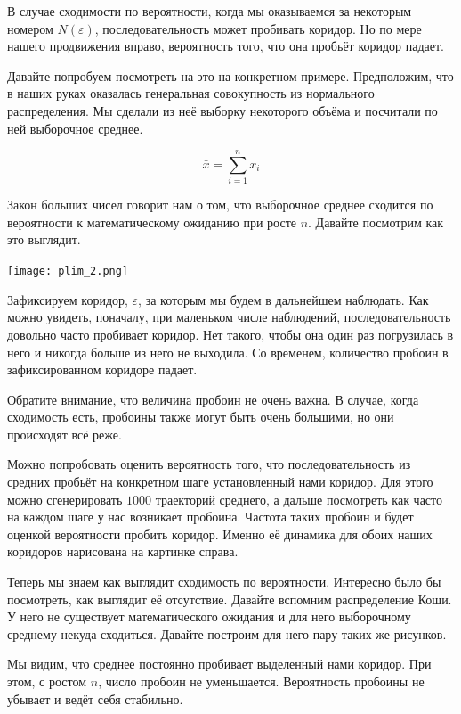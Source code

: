 \documentclass[12pt, a4paper, oneside]{article}
\begin{document}
В случае сходимости по вероятности, когда мы оказываемся за некоторым номером $N(\varepsilon)$, последовательность может пробивать коридор. Но по мере нашего продвижения вправо, вероятность того, что она пробьёт коридор падает. 

Давайте попробуем посмотреть на это на конкретном примере. Предположим, что в наших руках оказалась генеральная совокупность из нормального распределения. Мы сделали из неё выборку некоторого объёма и посчитали по ней выборочное среднее. 

$$
\bar x = \sum_{i=1}^n x_i
$$

Закон больших чисел говорит нам о том, что выборочное среднее сходится по вероятности к математическому ожиданию при росте $n$. Давайте посмотрим как это выглядит. 

\begin{center} 
\texttt{[image: plim\_2.png]}
\end{center} 

Зафиксируем коридор, $\varepsilon$, за которым мы будем в дальнейшем наблюдать. Как можно увидеть, поначалу, при маленьком числе наблюдений, последовательность довольно часто пробивает коридор. Нет такого, чтобы она один раз погрузилась в него и никогда больше из него не выходила. Со временем, количество пробоин в зафиксированном коридоре падает.

Обратите внимание, что величина пробоин не очень важна. В случае, когда сходимость есть, пробоины также могут быть очень большими, но они происходят всё реже. 

Можно попробовать оценить вероятность того, что последовательность из средних пробьёт на конкретном шаге установленный нами коридор. Для этого можно сгенерировать $1000$ траекторий среднего, а дальше посмотреть как часто на каждом шаге у нас возникает пробоина. Частота таких пробоин и будет оценкой вероятности пробить коридор. Именно её динамика для обоих наших коридоров нарисована на картинке справа. 

Теперь мы знаем как выглядит сходимость по вероятности. Интересно было бы посмотреть, как выглядит её отсутствие. Давайте вспомним распределение Коши. У него не существует математического ожидания и для него выборочному среднему некуда сходиться. Давайте построим для него пару таких же рисунков. 

Мы видим, что среднее постоянно пробивает выделенный нами коридор. При этом, с ростом $n$, число пробоин не уменьшается. Вероятность пробоины не убывает и ведёт себя стабильно. 
\end{document}
